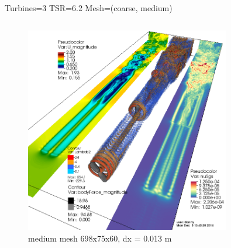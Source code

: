 \documentclass[xcolor=x11names,compress]{beamer}
\begin{document}
\begin{frame}{Turbines=3  TSR=6.2  Mesh=(coarse, medium)}
\begin{columns}
		    \begin{column}{0.6\textwidth}
		        \begin{figure}[p]
				    \centering
				    \includegraphics[width=0.8\textwidth]{figures/fastFlume__Turbines=3_TSR=6p2_Layout=offset_Mesh=medium.png}
				    \caption{\scriptsize{medium mesh 698x75x60, dx = 0.013 m}}
				\end{figure}

		    \end{column}

		\end{columns}

	\end{frame}
\end{document}
